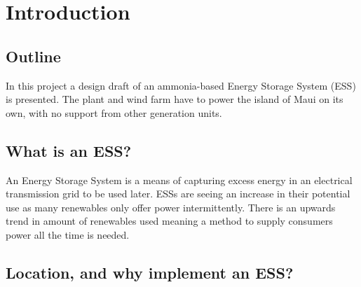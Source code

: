 

\section{Introduction}
\subsection{Outline}

In this project a design draft of an ammonia-based Energy Storage System (ESS) is presented.
The plant and wind farm have to power the island of Maui on its own, with no support from other generation units.


\subsection{What is an ESS?}

An Energy Storage System is a means of capturing excess energy in an electrical transmission grid to be used later.
ESSs are seeing an increase in their potential use as many renewables only offer power intermittently. There is an upwards trend in amount of renewables used \cite{intro:growth} meaning a method to supply consumers power all the time is needed.

\subsection{Location, and why implement an ESS?}

